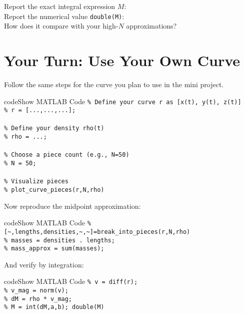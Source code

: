 \documentclass{ximera}
\begin{document}
\begin{problem}
Report the exact integral expression \(M\): \\
Report the numerical value \texttt{double(M)}: \\
How does it compare with your high-\(N\) approximations? 
\end{problem}

\section*{Your Turn: Use Your Own Curve}

Follow the same steps for the curve you plan to use in the mini project.

\begin{expandable}{code}{Show MATLAB Code}
\texttt{\% Define your curve r as [x(t), y(t), z(t)]}\\
\texttt{\% r = [\;...\;,\;...\;,\;...\;];}\\
\\
\texttt{\% Define your density rho(t)}\\
\texttt{\% rho = ...;}\\
\\
\texttt{\% Choose a piece count (e.g., N=50)}\\
\texttt{\% N = 50;}\\
\\
\texttt{\% Visualize pieces}\\
\texttt{\% plot\_curve\_pieces(r,\;N,\;rho)}
\end{expandable}

Now reproduce the midpoint approximation:

\begin{expandable}{code}{Show MATLAB Code}
\texttt{\% [\textasciitilde,\;lengths,\;densities,\;\textasciitilde,\;\textasciitilde]\;=\;break\_into\_pieces(r,\;N,\;rho)}\\
\texttt{\% masses = densities .\* lengths;}\\
\texttt{\% mass\_approx = sum(masses);}
\end{expandable}

And verify by integration:

\begin{expandable}{code}{Show MATLAB Code}
\texttt{\% v = diff(r);}\\
\texttt{\% v\_mag = norm(v);}\\
\texttt{\% dM = rho * v\_mag;}\\
\texttt{\% M = int(dM,\;a,\;b); \quad double(M)}
\end{expandable}
\end{document}
